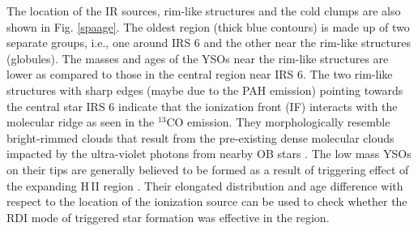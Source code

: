 \documentclass[a4paper,fleqn,usenatbib,useAMS]{mnras}
\begin{document}
The location of the IR sources, rim-like structures and the cold clumps are also 
shown in Fig. \ref{spaage}.
The oldest region (thick blue contours) is made up of two separate groups, i.e., one around IRS 6 and the other near the rim-like structures (globules).
The masses and ages of the YSOs near the rim-like structures are lower as compared to those in the central region near IRS 6.  
The two rim-like structures with sharp edges (maybe due to the PAH emission) 
pointing towards the central star IRS 6 indicate that the ionization front (IF) interacts with the molecular ridge as seen in the $^{13}$CO emission.
They morphologically resemble bright-rimmed clouds that result from the pre-existing dense molecular clouds impacted by the ultra-violet 
photons from nearby OB stars \citep{1994A&A...289..559L}.
The low mass YSOs on their tips are generally believed to be formed as a result of triggering effect of the expanding H\,{\sevensize II} region 
\citep{2005A&A...433..565D,2006A&A...446..171Z,2008ApJ...688.1142K,2009A&A...496..177D}.
Their elongated distribution and age difference with respect to the location of
the ionization source can be used to check whether the RDI \citep[][]{1994A&A...289..559L,2006MNRAS.369..143M} 
mode of triggered star formation was effective in the region.
\end{document}
